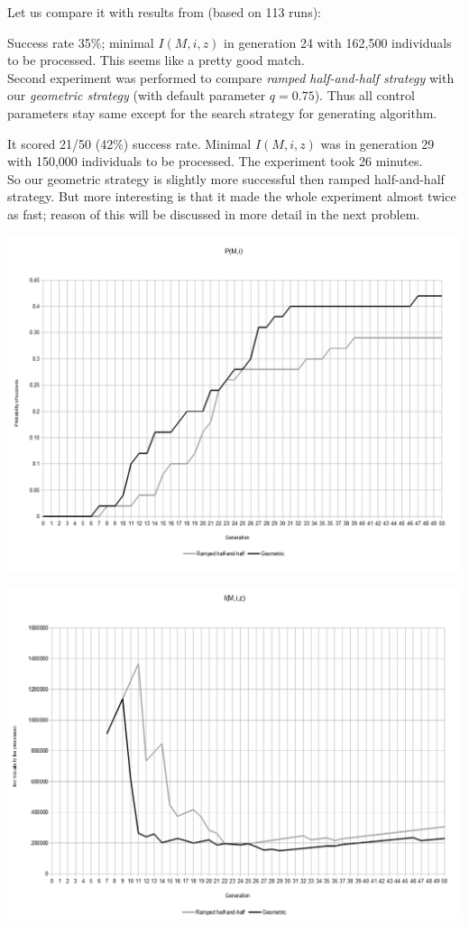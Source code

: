 \documentclass[12pt,a4paper]{report}
\newcommand{\Lets}{Let us\xspace}
\begin{document}
\Lets compare it with results from \cite{koza92} (based on 113 runs):

Success rate 35\%; minimal $I(M,i,z)$ in generation 24 
with 162,500 individuals to be processed.
 This seems like a pretty good match.
\\



Second experiment was performed to compare 
\textit{ramped half-and-half strategy} with our
\textit{geometric strategy} (with default parameter $q=0.75$). 
Thus all control parameters stay same except for the 
search strategy for generating algorithm.

It scored 21/50 (42\%) success rate. 
Minimal $I(M,i,z)$ was in generation 29 
with 150,000 individuals to be processed.
The experiment took 26 minutes.\\

So our geometric strategy is slightly more successful then 
ramped half-and-half strategy. But more interesting is that
it made the whole experiment almost twice as fast; 
reason of this will be discussed in more detail in the next problem. 

\includegraphics[scale=0.45]{reports/SSR/p.png}

\includegraphics[scale=0.45]{reports/SSR/i.png}
\end{document}
